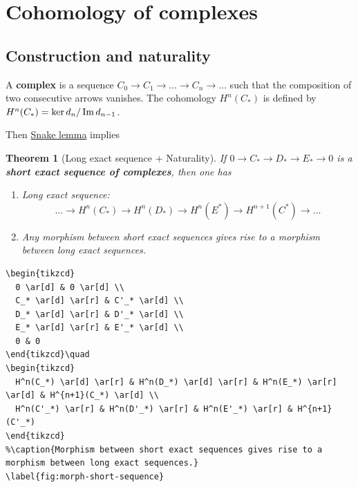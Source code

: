 \documentclass[11pt]{article}
\newtheorem{theorem}{Theorem}
\newcommand{\im}{\mathop{\rm Im}\nolimits}
\begin{document}
\section{Cohomology of complexes}
\label{sec:orgbad4845}

\subsection{Construction and naturality}
\label{sec:orgdb74180}
  A \textbf{complex} is a sequence \(C_0 \longrightarrow C_1 \longrightarrow \dots \longrightarrow C_n
\longrightarrow \dots\) such that the composition of two consecutive arrows vanishes. The
cohomology \(H^n(C_*)\) is defined by \(H^n(C_*) = \ker d_{n}/ \im d_{n-1}\).

Then \href{https://en.wikipedia.org/wiki/Snake\_lemma}{Snake lemma} implies

\begin{theorem}[Long exact sequence + Naturality]
\label{thm:cohomology-complex}
If \(0 \longrightarrow  C_* \longrightarrow D_* \longrightarrow E_* \longrightarrow 0\)
is a \textbf{short exact sequence of complexes}, then one has
\begin{enumerate}
\item Long exact sequence:
\[\dots \longrightarrow  H^n(C_*) \longrightarrow  H^n(D_*) \longrightarrow H^n(E^*) \longrightarrow
   H^{n+1}(C^*) \longrightarrow \dots \]
\item Any morphism between short exact sequences gives rise to a morphism between long exact sequences.
\end{enumerate}
\end{theorem}

\begin{verbatim}
\begin{tikzcd}
  0 \ar[d] & 0 \ar[d] \\
  C_* \ar[d] \ar[r] & C'_* \ar[d] \\
  D_* \ar[d] \ar[r] & D'_* \ar[d] \\
  E_* \ar[d] \ar[r] & E'_* \ar[d] \\
  0 & 0 
\end{tikzcd}\quad 
\begin{tikzcd} 
  H^n(C_*) \ar[d] \ar[r] & H^n(D_*) \ar[d] \ar[r] & H^n(E_*) \ar[r] \ar[d] & H^{n+1}(C_*) \ar[d] \\
  H^n(C'_*) \ar[r] & H^n(D'_*) \ar[r] & H^n(E'_*) \ar[r] & H^{n+1}(C'_*) 
\end{tikzcd}
%\caption{Morphism between short exact sequences gives rise to a morphism between long exact sequences.}
\label{fig:morph-short-sequence}
\end{verbatim}
\end{document}
